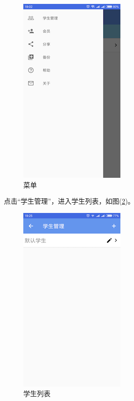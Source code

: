 \begin{figure}[H]
	\centering
	\includegraphics{img/6.png}
	\caption{菜单}
	\label{img6}
\end{figure}

点击“学生管理”，进入学生列表，如图(\ref{img7})。

\begin{figure}[H]
	\centering
	\includegraphics{img/7.png}
	\caption{学生列表}
	\label{img7}
\end{figure}

